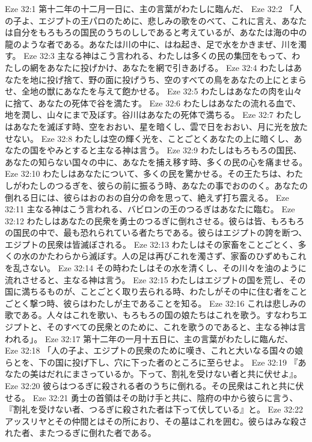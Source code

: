 Eze 32:1  第十二年の十二月一日に、主の言葉がわたしに臨んだ、
Eze 32:2  「人の子よ、エジプトの王パロのために、悲しみの歌をのべて、これに言え、あなたは自分をもろもろの国民のうちのししであると考えているが、あなたは海の中の龍のような者である。あなたは川の中に、はね起き、足で水をかきまぜ、川を濁す。
Eze 32:3  主なる神はこう言われる、わたしは多くの民の集団をもって、わたしの網をあなたに投げかけ、あなたを網で引きあげる。
Eze 32:4  わたしはあなたを地に投げ捨て、野の面に投げうち、空のすべての鳥をあなたの上にとまらせ、全地の獣にあなたを与えて飽かせる。
Eze 32:5  わたしはあなたの肉を山々に捨て、あなたの死体で谷を満たす。
Eze 32:6  わたしはあなたの流れる血で、地を潤し、山々にまで及ぼす。谷川はあなたの死体で満ちる。
Eze 32:7  わたしはあなたを滅ぼす時、空をおおい、星を暗くし、雲で日をおおい、月に光を放たせない。
Eze 32:8  わたしは空の輝く光を、ことごとくあなたの上に暗くし、あなたの国をやみとすると主なる神は言う。
Eze 32:9  わたしはもろもろの国民、あなたの知らない国々の中に、あなたを捕え移す時、多くの民の心を痛ませる。
Eze 32:10  わたしはあなたについて、多くの民を驚かせる。その王たちは、わたしがわたしのつるぎを、彼らの前に振るう時、あなたの事でおののく。あなたの倒れる日には、彼らはおのおの自分の命を思って、絶えず打ち震える。
Eze 32:11  主なる神はこう言われる、バビロンの王のつるぎはあなたに臨む。
Eze 32:12  わたしはあなたの民衆を勇士のつるぎに倒れさせる。彼らは皆、もろもろの国民の中で、最も恐れられている者たちである。彼らはエジプトの誇を断つ、エジプトの民衆は皆滅ぼされる。
Eze 32:13  わたしはその家畜をことごとく、多くの水のかたわらから滅ぼす。人の足は再びこれを濁さず、家畜のひずめもこれを乱さない。
Eze 32:14  その時わたしはその水を清くし、その川々を油のように流れさせると、主なる神は言う。
Eze 32:15  わたしはエジプトの国を荒し、その国に満ちるものが、ことごとく取り去られる時、わたしがその中に住む者をことごとく撃つ時、彼らはわたしが主であることを知る。
Eze 32:16  これは悲しみの歌である。人々はこれを歌い、もろもろの国の娘たちはこれを歌う。すなわちエジプトと、そのすべての民衆とのために、これを歌うのであると、主なる神は言われる」。
Eze 32:17  第十二年の一月十五日に、主の言葉がわたしに臨んだ、
Eze 32:18  「人の子よ、エジプトの民衆のために嘆き、これと大いなる国々の娘らとを、下の国に投げ下し、穴に下った者のところに至らせよ。
Eze 32:19  『あなたの美はだれにまさっているか。下って、割礼を受けない者と共に伏せよ』。
Eze 32:20  彼らはつるぎに殺される者のうちに倒れる。その民衆はこれと共に伏せる。
Eze 32:21  勇士の首領はその助け手と共に、陰府の中から彼らに言う、『割礼を受けない者、つるぎに殺された者は下って伏している』と。
Eze 32:22  アッスリヤとその仲間とはその所におり、その墓はこれを囲む。彼らはみな殺された者、またつるぎに倒れた者である。
